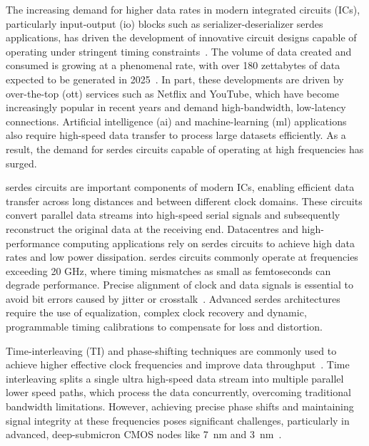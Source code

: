 The increasing demand for higher data rates in modern integrated circuits (ICs), particularly input-output (\gls{io}) blocks such as serializer-deserializer \gls{serdes} applications, has driven the development of innovative circuit designs capable of operating under stringent timing constraints~\cite{horowitz2005scaling,seok2010progress}. The volume of data created and consumed is growing at a phenomenal rate, with over 180 zettabytes of data expected to be generated in 2025~\cite{consultancy2024data}. In part, these developments are driven by over-the-top (\gls{ott}) services such as Netflix and YouTube, which have become increasingly popular in recent years and demand high-bandwidth, low-latency connections. Artificial intelligence (\gls{ai}) and machine-learning (\gls{ml}) applications also require high-speed data transfer to process large datasets efficiently. As a result, the demand for \gls{serdes} circuits capable of operating at high frequencies has surged.

\gls{serdes} circuits are important components of modern ICs, enabling efficient data transfer across long distances and between different clock domains. These circuits convert parallel data streams into high-speed serial signals and subsequently reconstruct the original data at the receiving end. Datacentres and high-performance computing applications rely on \gls{serdes} circuits to achieve high data rates and low power dissipation. \gls{serdes} circuits commonly operate at frequencies exceeding 20 GHz, where timing mismatches as small as femtoseconds can degrade performance. Precise alignment of clock and data signals is essential to avoid bit errors caused by jitter or crosstalk~\cite{lee2011self,nakamura2022high}. Advanced \gls{serdes} architectures require the use of equalization, complex clock recovery and dynamic, programmable timing calibrations to compensate for loss and distortion.

Time-interleaving (TI) and phase-shifting techniques are commonly used to achieve higher effective clock frequencies and improve data throughput~\cite{Razavi2009PLL}. Time interleaving splits a single ultra high-speed data stream into multiple parallel lower speed paths, which process the data concurrently, overcoming traditional bandwidth limitations. However, achieving precise phase shifts and maintaining signal integrity at these frequencies poses significant challenges, particularly in advanced, deep-submicron CMOS nodes like 7~nm and 3~nm~\cite{loke2019nanoscale,caignet2001challenge}.


